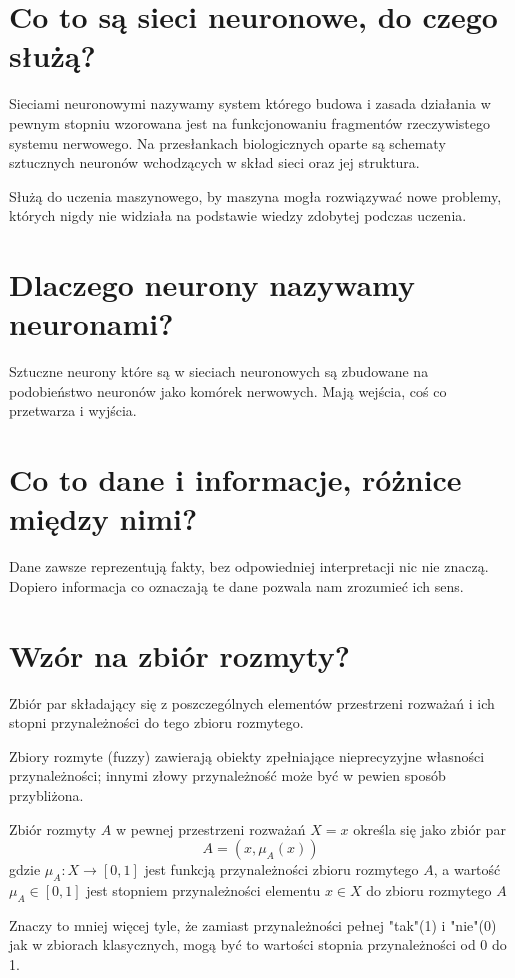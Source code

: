 \documentclass[a4paper,12pt]{article}
\begin{document}
\section{Co to są sieci neuronowe, do czego służą?}
Sieciami neuronowymi nazywamy system którego budowa i zasada
działania w pewnym stopniu wzorowana jest na funkcjonowaniu
fragmentów rzeczywistego systemu nerwowego. Na przesłankach
biologicznych oparte są schematy sztucznych neuronów wchodzących w
skład sieci oraz jej struktura.

Służą do uczenia maszynowego, by maszyna mogła rozwiązywać nowe
problemy, których nigdy nie widziała na podstawie wiedzy zdobytej
podczas uczenia.

\section{Dlaczego neurony nazywamy neuronami?}
Sztuczne neurony które są w sieciach neuronowych są zbudowane na
podobieństwo neuronów jako komórek nerwowych. Mają wejścia, coś co
przetwarza i wyjścia.

\section{Co to dane i informacje, różnice między nimi?}
Dane zawsze reprezentują fakty, bez odpowiedniej interpretacji nic nie
znaczą. Dopiero informacja co oznaczają te dane pozwala nam
zrozumieć ich sens.

\section{Wzór na zbiór rozmyty?}
Zbiór par składający się z poszczególnych elementów przestrzeni
rozważań i ich stopni przynależności do tego zbioru rozmytego. 

Zbiory rozmyte (fuzzy) zawierają obiekty zpełniające nieprecyzyjne własności przynależności;
innymi złowy przynależność może być w pewien sposób przybliżona.

Zbiór rozmyty $A$ w pewnej przestrzeni rozważań $X = {x}$ określa się jako zbiór par
\[
    A = {(x, \mu_A(x))}
\]
gdzie \break $\mu_A: X \to [0, 1]$ jest funkcją przynależności zbioru rozmytego $A$,
a wartość $\mu_A \in [0, 1]$ jest stopniem przynależności elementu $x \in X$ do zbioru
rozmytego $A$

Znaczy to mniej więcej tyle, że zamiast przynależności pełnej "tak"(1) i "nie"(0) jak w 
zbiorach klasycznych, mogą być to wartości stopnia przynależności od 0 do 1.
\end{document}
